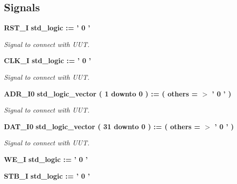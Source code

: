 \subsection*{Signals}
 \begin{DoxyCompactItemize}
\item 
{\bf R\-S\-T\-\_\-\-I} {\bfseries std\-\_\-logic  \-:= '  0  ' } \label{classtest_uart__wishbone__slave_1_1behavior_a6ee791bdb5df4ccca9dd8a946696dd8a}

\begin{DoxyCompactList}\small\item\em Signal to connect with U\-U\-T. \end{DoxyCompactList}\item 
{\bf C\-L\-K\-\_\-\-I} {\bfseries std\-\_\-logic  \-:= '  0  ' } \label{classtest_uart__wishbone__slave_1_1behavior_a4c7b3772ac2a67a7c972f606d2cc4ec7}

\begin{DoxyCompactList}\small\item\em Signal to connect with U\-U\-T. \end{DoxyCompactList}\item 
{\bf A\-D\-R\-\_\-\-I0} {\bfseries std\-\_\-logic\-\_\-vector (   1    downto    0  )  \-:= (  others  = $>$ '  0  '  ) } \label{classtest_uart__wishbone__slave_1_1behavior_a7a6abb7d1c91a8dfcf6ab3d0bf78a3ae}

\begin{DoxyCompactList}\small\item\em Signal to connect with U\-U\-T. \end{DoxyCompactList}\item 
{\bf D\-A\-T\-\_\-\-I0} {\bfseries std\-\_\-logic\-\_\-vector (   31    downto    0  )  \-:= (  others  = $>$ '  0  '  ) } \label{classtest_uart__wishbone__slave_1_1behavior_a4b087814632daf135cbc38c252bbaf77}

\begin{DoxyCompactList}\small\item\em Signal to connect with U\-U\-T. \end{DoxyCompactList}\item 
{\bf W\-E\-\_\-\-I} {\bfseries std\-\_\-logic  \-:= '  0  ' } \label{classtest_uart__wishbone__slave_1_1behavior_a7c70578f707dad097203747f4870b498}

\item 
{\bf S\-T\-B\-\_\-\-I} {\bfseries std\-\_\-logic  \-:= '  0  ' } \label{classtest_uart__wishbone__slave_1_1behavior_a861b1f4580110b89b3be07a9a2b29bf7}


\end{DoxyCompactItemize}
